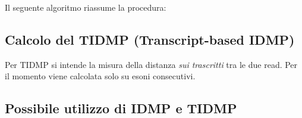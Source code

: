 Il seguente algoritmo riassume la procedura:

\newpage

\subsection{Calcolo del TIDMP (Transcript-based IDMP)}
Per TIDMP si intende la misura della distanza \textit{sui trascritti} tra le due read. Per il momento viene calcolata solo su esoni consecutivi.

\newpage

\subsection{Possibile utilizzo di IDMP e TIDMP}

\newpage